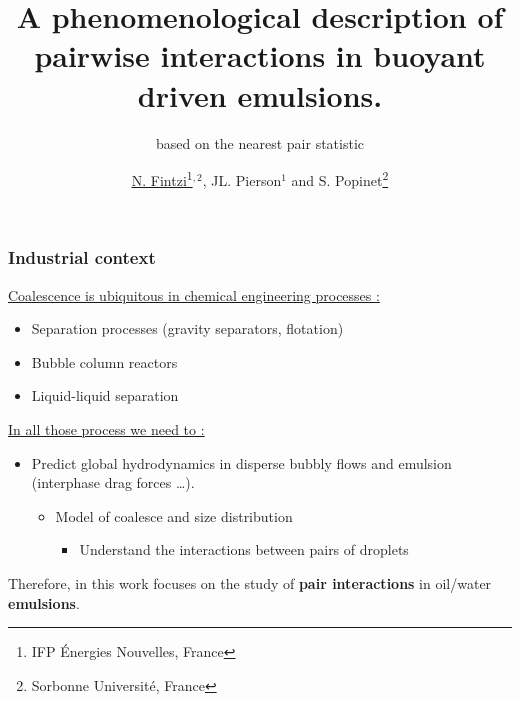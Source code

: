\documentclass{sintefbeamer}
\title{A phenomenological description of pairwise interactions in buoyant driven emulsions.}
\subtitle{based on the nearest pair statistic}
\author{\href{http://basilisk.fr/sandbox/fintzin/Rising-Suspenion/RS.c}{\underline{N. Fintzi}\footnote{IFP \'Energies Nouvelles, France}$^{,2}$}, JL. Pierson$^1$ and S. Popinet\footnote{Sorbonne Universit\'e, France}}
\begin{document}
\maketitle

\begin{frame}
  \frametitle{Industrial context}
  \underline{Coalescence is ubiquitous in chemical engineering processes :}
  \begin{itemize}
    \item Separation processes (gravity separators, flotation)
    \item Bubble column reactors
    \item Liquid-liquid separation
  \end{itemize}
  \vfill
  \underline{In all those process we need to : }
  \begin{itemize}
    \item Predict global hydrodynamics in disperse bubbly flows and emulsion (interphase drag forces \ldots).
    \begin{itemize}
      \item Model of coalesce and size distribution 
      \begin{itemize}
        \item Understand the interactions between pairs of droplets
      \end{itemize}
    \end{itemize}
  \end{itemize}

  \vfill
  Therefore, in this work focuses on the study of \textbf{pair interactions} in oil/water \textbf{emulsions}.
\end{frame}


  

\end{document}
